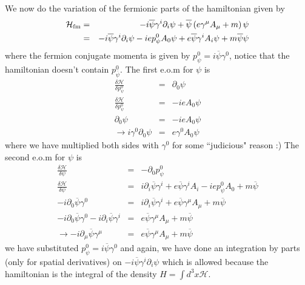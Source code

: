 \documentclass[aps,preprint,preprintnumbers,nofootinbib,showpacs,prd]{revtex4-1}
\newcommand{\nbea}{\begin{eqnarray*}}
\newcommand{\neea}{\end{eqnarray*}}
\begin{document}
We now do the variation of the fermionic parts of the hamiltonian given by  
%
\nbea
\mathcal{H}_{\rm fm} & = & - i \overline \psi \gamma^i \partial_i \psi + \overline \psi \left ( e \gamma^\mu A_\mu + m\right ) \psi \\
& = & - i \overline \psi \gamma^i \partial_i \psi -i e p^0_\psi A_0 \psi  + e \overline \psi \gamma^i A_i \psi + m \overline \psi \psi
\neea
%
where the fermion conjugate momenta is given by $p^0_\psi = i \overline \psi \gamma^0$, notice that the hamiltonian doesn't contain $p^0_{\overline \psi}$. The first e.o.m for $\psi$ is
%
\nbea
\frac{\delta \mathcal{H}}{\delta p^0_\psi} & = & \partial_0 \psi \\
\frac{\delta \mathcal{H}}{\delta p^0_\psi} & = & -i e A_0 \psi \\
\partial_0 \psi  & = & -i e A_0 \psi \\
\rightarrow i \gamma^0 \partial_0 \psi  & = & e \gamma^0 A_0 \psi 
\neea
%
where we have multiplied both sides with $\gamma^0 $ for some ``judicious" reason :) The second e.o.m for $\psi$ is
%
\nbea
\frac{\delta \mathcal{H}}{\delta \psi} & = & -\partial_0 p^0_\psi \\
\frac{\delta \mathcal{H}}{\delta \psi} & = &  i \partial_i \overline \psi \gamma^i + e \overline \psi \gamma^i A_i -i e p^0_\psi A_0 + m \overline \psi \\
- i \partial_0 \overline \psi \gamma^0 & = &  i \partial_i \overline \psi \gamma^i + e \overline \psi \gamma^\mu A_\mu+ m \overline \psi \\
- i \partial_0 \overline \psi \gamma^0 -  i \partial_i \overline \psi \gamma^i & = & e \overline \psi \gamma^\mu A_\mu + m \overline \psi \\
\rightarrow -  i \partial_\mu \overline \psi \gamma^\mu & = & e \overline \psi \gamma^\mu A_\mu + m \overline \psi
\neea
%
we have substituted $p^0_{\psi} = i \overline \psi \gamma^0$ and again, we have done an integration by parts (only for spatial derivatives) on $- i \overline \psi \gamma^i \partial_i \psi $ which is allowed because the hamiltonian is the integral of the density $H = \int d^3x \mathcal{H}$.
\end{document}
